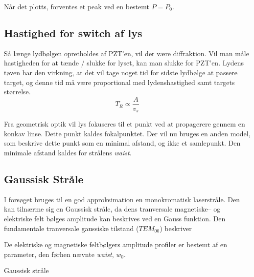 \documentclass[main]{subfiles}
\begin{document}
Når det plotts, forventes et peak ved en bestemt $P=P_0$. 

\subsection{Hastighed for switch af lys}
Så længe lydbølgen opretholdes af PZT'en, vil der være diffraktion. Vil man måle hastigheden for at tænde / slukke for lyset, kan man slukke for PZT'en. Lydens tøven har den virkning, at det vil tage noget tid for sidste lydbølge at passere target, og denne tid må være proportional med lydenshastighed samt targets størrelse.
\begin{equation}
    T_R \propto \frac{A}{v_s}
    \label{eq:risetime}
\end{equation}

Fra geometrisk optik vil lys fokuseres til et punkt ved at propagerere gennem en konkav linse. Dette punkt kaldes fokalpunktet.
Der vil nu bruges en anden model, som beskrive dette punkt som en minimal afstand, og ikke et samlepunkt. Den minimale afstand kaldes for strålens \emph{waist}.
\subsection{Gaussisk Stråle}
I forsøget bruges til en god approksimation en monokromatisk laserstråle. Den kan tilnærme sig en Gaussisk stråle, da dens tranversale magnetiske-- og elektriske felt bølges amplitude kan beskrives ved en Gauss funktion. Den fundamentale tranversale gaussiske tilstand ($TEM_00$) beskriver 

De elektriske og magnetiske feltbølgers amplitude profiler er bestemt af en parameter, den førhen nævnte \emph{waist}, $w_0$.

Gaussisk stråle
\end{document}
